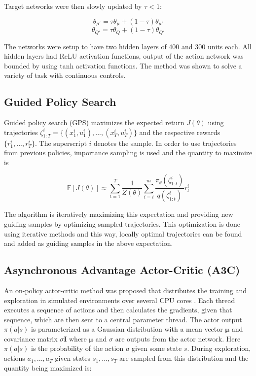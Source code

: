 Target networks were then slowly updated by $\tau < 1$:

\begin{equation}
    \theta_{\mu'} = \tau \theta_{\mu} + (1 - \tau) \theta_{\mu'}
\end{equation}
\begin{equation}
    \theta_{Q'} = \tau \theta_{Q} + (1 - \tau) \theta_{Q'}
\end{equation}

The networks were setup to have two hidden layers of $400$ and $300$ units
each.  All hidden layers had ReLU activation functions, output of the action
network was bounded by using tanh activation functions. The method was shown to
solve a variety of task with continuous controls.

\subsection{Guided Policy Search}

Guided policy search (GPS) \cite{levine2013guided} maximizes the expected
return $J(\theta)$ using trajectories $\zeta^i_{1:T} = \{(x_1^i, u_1^i), ...,
(x_T^i, u_T^i)\}$ and the respective rewards $\{r_1^i, ..., r_T^i\}$. The
superscript $i$ denotes the sample. In order to use trajectories from previous
policies, importance sampling is used and the quantity to maximize is

\begin{equation}
    \mathbb{E}[J(\theta)] \approx \sum_{t=1}^T \frac{1}{Z(\theta)} \sum_{i=i}^m \frac{\pi_\theta(\zeta^i_{1:t})}{q(\zeta^i_{1:t})}r_t^i
\end{equation}

The algorithm is iteratively maximizing this expectation and providing new
guiding samples by optimizing sampled trajectories. This optimization is done
using iterative methods and this way, locally optimal trajectories can be found
and added as guiding samples in the above expectation.

\subsection{Asynchronous Advantage Actor-Critic (A3C)}

An on-policy actor-critic method was proposed that distributes the training
and exploration in simulated environments over several CPU cores
\cite{mnih2016asynchronous}. Each thread executes a sequence of actions and
then calculates the gradients, given that sequence, which are then sent to a
central parameter thread. The actor output $\pi(a|s)$ is parameterized as a Gaussian distribution
with a mean vector $\mathbf{\mu}$ and covariance matrix $\sigma\mathbf{I}$ where $\mathbf{\mu}$
and $\sigma$ are outputs from the actor network. Here $\pi(a|s)$ is the probability of the action $a$ given
some state $s$.
During exploration, actions $a_1, ..., a_T$ given states $s_1, ..., s_T$ are sampled from this distribution and the quantity being maximized
is:

